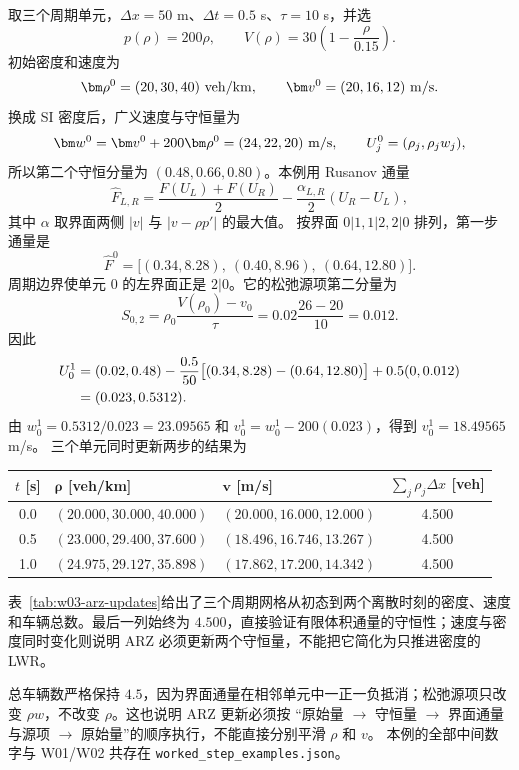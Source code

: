 \documentclass[11pt,a4paper,openany]{book}
\numberwithin{equation}{chapter}
\numberwithin{figure}{chapter}
\numberwithin{table}{chapter}
\newcommand{\tabletext}[2]{%
  \par\smallskip\noindent
  表~\ref{#1}给出了#2
  \par\smallskip
}
\begin{document}
取三个周期单元，$\Delta x=50$ m、$\Delta t=0.5$ s、$\tau=10$ s，并选
\[
p(\rho)=200\rho,\qquad
V(\rho)=30\left(1-\frac{\rho}{0.15}\right).
\]
初始密度和速度为
\[
\bm\rho^0=(20,30,40)\ {\rm veh/km},\qquad
\bm v^0=(20,16,12)\ {\rm m/s}.
\]
换成 SI 密度后，广义速度与守恒量为
\begin{equation}
\bm w^0=\bm v^0+200\bm\rho^0=(24,22,20)\ {\rm m/s},
\qquad
U^0_j=(\rho_j,\rho_jw_j),
\label{eq:w03-conserved-initial}
\end{equation}
所以第二个守恒分量为 $(0.48,0.66,0.80)$。本例用 Rusanov 通量
\begin{equation}
\widehat F_{L,R}
=\frac{F(U_L)+F(U_R)}{2}
-\frac{\alpha_{L,R}}{2}(U_R-U_L),
\label{eq:w03-rusanov}
\end{equation}
其中 $\alpha$ 取界面两侧 $|v|$ 与 $|v-\rho p'|$ 的最大值。
按界面 $0|1,1|2,2|0$ 排列，第一步通量是
\begin{equation}
\widehat F^0=
\bigl[(0.34,8.28),\ (0.40,8.96),\ (0.64,12.80)\bigr].
\label{eq:w03-first-flux}
\end{equation}
周期边界使单元 0 的左界面正是 $2|0$。它的松弛源项第二分量为
\[
S_{0,2}=\rho_0\frac{V(\rho_0)-v_0}{\tau}
=0.02\frac{26-20}{10}=0.012.
\]
因此
\begin{align}
U_0^1
&=(0.02,0.48)-\frac{0.5}{50}
\bigl[(0.34,8.28)-(0.64,12.80)\bigr]
+0.5(0,0.012)\notag\\
&=(0.023,0.5312).
\label{eq:w03-cell0-update}
\end{align}
由 $w_0^1=0.5312/0.023=23.09565$ 和
$v_0^1=w_0^1-200(0.023)$，得到 $v_0^1=18.49565$ m/s。
三个单元同时更新两步的结果为
\begin{center}
\small
{}
\label{tab:w03-arz-updates}
\begin{tabular}{c p{4.7cm} p{4.7cm} c}
\toprule
$t$ [s] & $\bm\rho$ [veh/km] & $\bm v$ [m/s] & $\sum_j\rho_j\Delta x$ [veh]\\
\midrule
0.0 & $(20.000,30.000,40.000)$ & $(20.000,16.000,12.000)$ & 4.500\\
0.5 & $(23.000,29.400,37.600)$ & $(18.496,16.746,13.267)$ & 4.500\\
1.0 & $(24.975,29.127,35.898)$ & $(17.862,17.200,14.342)$ & 4.500\\
\bottomrule
\end{tabular}
\end{center}
\tabletext{tab:w03-arz-updates}{三个周期网格从初态到两个离散时刻的密度、速度和车辆总数。最后一列始终为 $4.500$，直接验证有限体积通量的守恒性；速度与密度同时变化则说明 ARZ 必须更新两个守恒量，不能把它简化为只推进密度的 LWR。}
总车辆数严格保持 $4.5$，因为界面通量在相邻单元中一正一负抵消；松弛源项只改变
$\rho w$，不改变 $\rho$。这也说明 ARZ 更新必须按
“原始量 $\rightarrow$ 守恒量 $\rightarrow$ 界面通量与源项
$\rightarrow$ 原始量”的顺序执行，不能直接分别平滑 $\rho$ 和 $v$。
本例的全部中间数字与 W01/W02 共存在
\texttt{worked\_step\_examples.json}。
\end{document}

